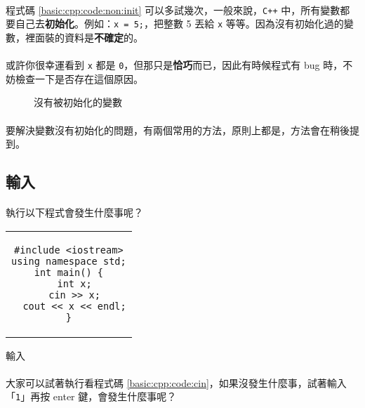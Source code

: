 \documentclass[12pt,a4paper,oneside]{report}
\begin{document}
\begin{CJK}{UTF8}{bkai}
\paragraph{}程式碼 \ref{basic:cpp:code:non:init} 可以多試幾次，一般來說，\texttt{C++} 中，所有變數都要自己去\textbf{初始化}。例如：\lstinline!x = 5;!，把整數 5 丟給 \lstinline!x! 等等。因為沒有初始化過的變數，裡面裝的資料是\textbf{不確定}的。

\paragraph{}或許你很幸運看到 \lstinline!x! 都是 \lstinline!0!，但那只是\textbf{恰巧}而已，因此有時候程式有 bug 時，不妨檢查一下是否存在這個原因。

\begin{figure}[h!]
\centering
{}
\caption{沒有被初始化的變數}
\label{basic:cpp:fig:non:init:variable}
\end{figure}

\paragraph{}要解決變數沒有初始化的問題，有兩個常用的方法，原則上都是，方法會在稍後提到。

\subsection{輸入}

\paragraph{}執行以下程式會發生什麼事呢？

\begin{code}[h!]
\centering
\begin{tabular}{c}
\begin{lstlisting}
#include <iostream>
using namespace std;
int main() {
  int x;
  cin >> x;
  cout << x << endl;
}
\end{lstlisting}
\end{tabular}
\caption{輸入}
\label{basic:cpp:code:cin}
\end{code}

\paragraph{}大家可以試著執行看程式碼 \ref{basic:cpp:code:cin}，如果沒發生什麼事，試著輸入「\lstinline!1!」再按 enter 鍵，會發生什麼事呢？

\end{CJK}
\end{document}
